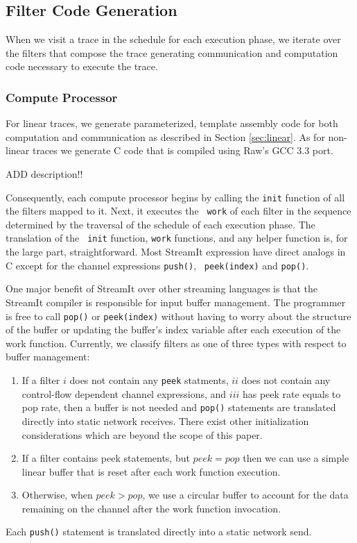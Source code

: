 \subsection{Filter Code Generation}
When we visit a trace in the schedule for each execution phase, we
iterate over the filters that compose the trace generating 
communication and computation code necessary to execute the trace.

\subsubsection{Compute Processor}
For linear traces, we generate parameterized, template assembly code
for both computation and communication as described in Section
\ref{sec:linear}.  As for non-linear traces we generate C code that is
compiled using Raw's GCC 3.3 port.  

ADD description!!

Consequently, each compute processor begins by calling the {\tt init}
function of all the filters mapped to it.  Next, it executes the {\tt
work} of each filter in the sequence determined by the traversal of
the schedule of each execution phase.  The translation of the {\tt
init} function, {\tt work} functions, and any helper function is, for
the large part, straightforward.  Most StreamIt expression have direct
analogs in C except for the channel expressions {\tt push()}, {\tt
peek(index)} and {\tt pop()}.

One major benefit of StreamIt over other streaming languages is that
the StreamIt compiler is responsible for input buffer management.  The
programmer is free to call {\tt pop()} or {\tt peek(index)} without
having to worry about the structure of the buffer or updating the
buffer's index variable after each execution of the work function.
Currently, we classify filters as one of three types with respect to
buffer management: 
\begin{enumerate}
\item If a filter $i$ does not contain any {\tt peek} statments, $ii$
does not contain any control-flow dependent channel expressions, and
$iii$ has peek rate equals to pop rate, then a buffer is not needed
and {\tt pop()} statements are translated directly into static network
receives.  There exist other initialization considerations which are
beyond the scope of this paper.
\item If a filter contains peek statements, but $peek = pop$ then we can
use a simple linear buffer that is reset after each work function execution.
\item Otherwise, when $peek > pop$, we use a circular buffer to
account for the data remaining on the channel after the work function
invocation.
\end{enumerate}
Each {\tt push()} statement is translated directly into a static
network send.  

